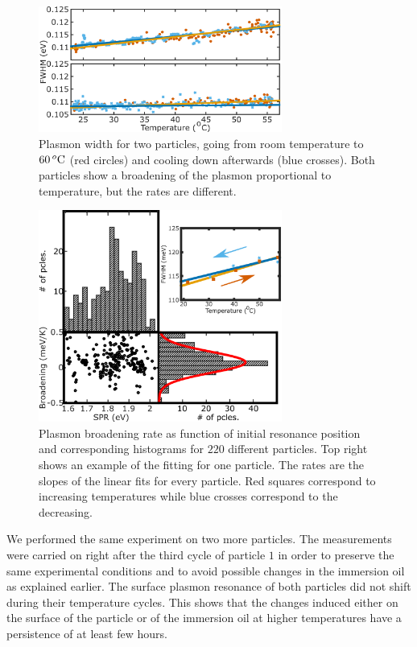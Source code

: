 \begin{figure}[htp] \centering 
\includegraphics[width=8cm]{Chapters/05_WhiteLight/Figures/03_Two_Pcles/03_Two_Pcles.png}
\caption{Plasmon width for two particles, 
going from room temperature to $60\,^o\textrm{C}$ (red circles) and cooling down
afterwards (blue crosses). Both particles show a broadening of the plasmon
proportional to temperature, but the rates are different.}	
\label{fig:two_pcles}
\end{figure}

\begin{figure}
\centering
\includegraphics[width=8cm]{Chapters/05_WhiteLight/Figures/04_Many_Pcles/04_Many_Particles.png}
\caption{Plasmon broadening rate as function of initial resonance position
and corresponding histograms for $220$ different particles. Top right shows an
example of the fitting for one particle. The rates are the slopes of the
linear fits for every particle. Red squares correspond to increasing
temperatures while blue crosses correspond to the decreasing.}
		\label{fig:many-pcles}
\end{figure}

We performed the same experiment on two more particles. The measurements were
carried on right after the third cycle of particle $1$ in order to preserve the
same experimental conditions and to avoid possible changes in the immersion oil
as explained earlier. The surface plasmon resonance of both particles did not
shift during their temperature cycles. This shows that the changes induced
either on the surface of the particle or of the immersion oil at higher
temperatures have a persistence of at least few hours.

